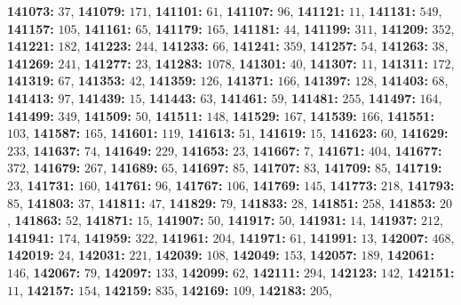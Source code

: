 \textsf{\bfseries 141073:} $37$, \textsf{\bfseries 141079:} $171$, \textsf{\bfseries 141101:} $61$, \textsf{\bfseries 141107:} $96$, \textsf{\bfseries 141121:} $11$, \textsf{\bfseries 141131:} $549$, \textsf{\bfseries 141157:} $105$, \textsf{\bfseries 141161:} $65$, \textsf{\bfseries 141179:} $165$, \textsf{\bfseries 141181:} $44$, \textsf{\bfseries 141199:} $311$, \textsf{\bfseries 141209:} $352$, \textsf{\bfseries 141221:} $182$, \textsf{\bfseries 141223:} $244$, \textsf{\bfseries 141233:} $66$, \textsf{\bfseries 141241:} $359$, \textsf{\bfseries 141257:} $54$, \textsf{\bfseries 141263:} $38$, \textsf{\bfseries 141269:} $241$, \textsf{\bfseries 141277:} $23$, \textsf{\bfseries 141283:} $1078$, \textsf{\bfseries 141301:} $40$, \textsf{\bfseries 141307:} $11$, \textsf{\bfseries 141311:} $172$, \textsf{\bfseries 141319:} $67$, \textsf{\bfseries 141353:} $42$, \textsf{\bfseries 141359:} $126$, \textsf{\bfseries 141371:} $166$, \textsf{\bfseries 141397:} $128$, \textsf{\bfseries 141403:} $68$, \textsf{\bfseries 141413:} $97$, \textsf{\bfseries 141439:} $15$, \textsf{\bfseries 141443:} $63$, \textsf{\bfseries 141461:} $59$, \textsf{\bfseries 141481:} $255$, \textsf{\bfseries 141497:} $164$, \textsf{\bfseries 141499:} $349$, \textsf{\bfseries 141509:} $50$, \textsf{\bfseries 141511:} $148$, \textsf{\bfseries 141529:} $167$, \textsf{\bfseries 141539:} $166$, \textsf{\bfseries 141551:} $103$, \textsf{\bfseries 141587:} $165$, \textsf{\bfseries 141601:} $119$, \textsf{\bfseries 141613:} $51$, \textsf{\bfseries 141619:} $15$, \textsf{\bfseries 141623:} $60$, \textsf{\bfseries 141629:} $233$, \textsf{\bfseries 141637:} $74$, \textsf{\bfseries 141649:} $229$, \textsf{\bfseries 141653:} $23$, \textsf{\bfseries 141667:} $7$, \textsf{\bfseries 141671:} $404$, \textsf{\bfseries 141677:} $372$, \textsf{\bfseries 141679:} $267$, \textsf{\bfseries 141689:} $65$, \textsf{\bfseries 141697:} $85$, \textsf{\bfseries 141707:} $83$, \textsf{\bfseries 141709:} $85$, \textsf{\bfseries 141719:} $23$, \textsf{\bfseries 141731:} $160$, \textsf{\bfseries 141761:} $96$, \textsf{\bfseries 141767:} $106$, \textsf{\bfseries 141769:} $145$, \textsf{\bfseries 141773:} $218$, \textsf{\bfseries 141793:} $85$, \textsf{\bfseries 141803:} $37$, \textsf{\bfseries 141811:} $47$, \textsf{\bfseries 141829:} $79$, \textsf{\bfseries 141833:} $28$, \textsf{\bfseries 141851:} $258$, \textsf{\bfseries 141853:} $20$, \textsf{\bfseries 141863:} $52$, \textsf{\bfseries 141871:} $15$, \textsf{\bfseries 141907:} $50$, \textsf{\bfseries 141917:} $50$, \textsf{\bfseries 141931:} $14$, \textsf{\bfseries 141937:} $212$, \textsf{\bfseries 141941:} $174$, \textsf{\bfseries 141959:} $322$, \textsf{\bfseries 141961:} $204$, \textsf{\bfseries 141971:} $61$, \textsf{\bfseries 141991:} $13$, \textsf{\bfseries 142007:} $468$, \textsf{\bfseries 142019:} $24$, \textsf{\bfseries 142031:} $221$, \textsf{\bfseries 142039:} $108$, \textsf{\bfseries 142049:} $153$, \textsf{\bfseries 142057:} $189$, \textsf{\bfseries 142061:} $146$, \textsf{\bfseries 142067:} $79$, \textsf{\bfseries 142097:} $133$, \textsf{\bfseries 142099:} $62$, \textsf{\bfseries 142111:} $294$, \textsf{\bfseries 142123:} $142$, \textsf{\bfseries 142151:} $11$, \textsf{\bfseries 142157:} $154$, \textsf{\bfseries 142159:} $835$, \textsf{\bfseries 142169:} $109$, \textsf{\bfseries 142183:} $205$, 
